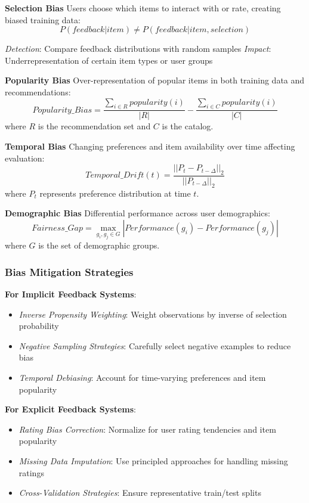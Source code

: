 \textbf{Selection Bias}
Users choose which items to interact with or rate, creating biased training data:
\begin{equation}
P(feedback|item) \neq P(feedback|item, selection)
\end{equation}

\textit{Detection}: Compare feedback distributions with random samples
\textit{Impact}: Underrepresentation of certain item types or user groups

\textbf{Popularity Bias}
Over-representation of popular items in both training data and recommendations:
\begin{equation}
Popularity\_Bias = \frac{\sum_{i \in R} popularity(i)}{|R|} - \frac{\sum_{i \in C} popularity(i)}{|C|}
\end{equation}
where $R$ is the recommendation set and $C$ is the catalog.

\textbf{Temporal Bias}
Changing preferences and item availability over time affecting evaluation:
\begin{equation}
Temporal\_Drift(t) = \frac{||P_t - P_{t-\Delta}||_2}{||P_{t-\Delta}||_2}
\end{equation}
where $P_t$ represents preference distribution at time $t$.

\textbf{Demographic Bias}
Differential performance across user demographics:
\begin{equation}
Fairness\_Gap = \max_{g_i, g_j \in G} |Performance(g_i) - Performance(g_j)|
\end{equation}
where $G$ is the set of demographic groups.

\subsubsection{Bias Mitigation Strategies}

\textbf{For Implicit Feedback Systems}:
\begin{itemize}
    \item \textit{Inverse Propensity Weighting}: Weight observations by inverse of selection probability
    \item \textit{Negative Sampling Strategies}: Carefully select negative examples to reduce bias
    \item \textit{Temporal Debiasing}: Account for time-varying preferences and item popularity
\end{itemize}

\textbf{For Explicit Feedback Systems}:
\begin{itemize}
    \item \textit{Rating Bias Correction}: Normalize for user rating tendencies and item popularity
    \item \textit{Missing Data Imputation}: Use principled approaches for handling missing ratings
    \item \textit{Cross-Validation Strategies}: Ensure representative train/test splits
\end{itemize}

